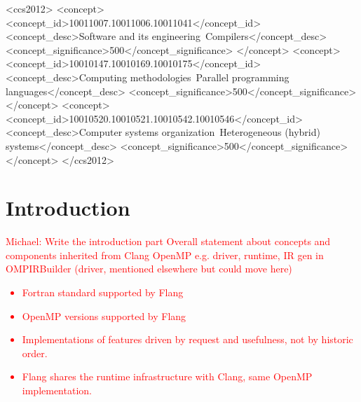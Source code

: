 \documentclass[acmtog,natbib=false]{acmart}
\newcommand{\todo}[1]{\textcolor{red}{#1}}
\begin{document}
\begin{CCSXML}
<ccs2012>
   <concept>
       <concept_id>10011007.10011006.10011041</concept_id>
       <concept_desc>Software and its engineering~Compilers</concept_desc>
       <concept_significance>500</concept_significance>
       </concept>
   <concept>
       <concept_id>10010147.10010169.10010175</concept_id>
       <concept_desc>Computing methodologies~Parallel programming languages</concept_desc>
       <concept_significance>500</concept_significance>
       </concept>
   <concept>
       <concept_id>10010520.10010521.10010542.10010546</concept_id>
       <concept_desc>Computer systems organization~Heterogeneous (hybrid) systems</concept_desc>
       <concept_significance>500</concept_significance>
       </concept>
 </ccs2012>
\end{CCSXML}



\maketitle


\section{Introduction}
\label{sec:Introduction}
\todo{Michael: Write the introduction part}
\todo{Overall statement about concepts and components inherited from Clang OpenMP e.g. driver, runtime, IR gen in OMPIRBuilder (driver, mentioned elsewhere but could move here)}
\todo{
\begin{itemize}
\item Fortran standard supported by Flang
\item OpenMP versions supported by Flang
\item Implementations of features driven by request and usefulness, not by historic order.
\item Flang shares the runtime infrastructure with Clang, same OpenMP implementation. 
\end{itemize}
}
\end{document}
